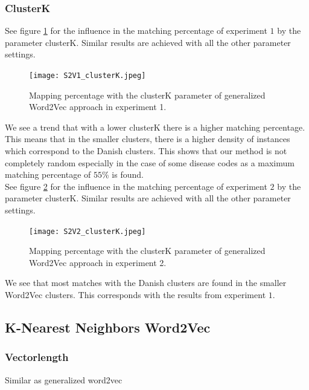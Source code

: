 \subsubsection{ClusterK}

See figure \ref{fig:s2v_clusterK_1} for the influence in the matching percentage of experiment $1$ by the parameter clusterK. Similar results are achieved with all the other parameter settings. \\

\begin{figure}[!htb]
	\centering
	\texttt{[image: S2V1\_clusterK.jpeg]}
	\caption{Mapping percentage with the clusterK parameter of generalized Word2Vec approach in experiment 1.}
	\label{fig:s2v_clusterK_1}
\end{figure}

\noindent We see a trend that with a lower clusterK there is a higher matching percentage. This means that in the smaller clusters, there is a higher density of instances which correspond to the Danish clusters. This shows that our method is not completely random especially in the case of some disease codes as a maximum matching percentage of $55$\% is found. \\

\noindent See figure \ref{fig:s2v_clusterK_2} for the influence in the matching percentage of experiment $2$ by the parameter clusterK. Similar results are achieved with all the other parameter settings. \\

\begin{figure}[!htb]
	\centering
	\texttt{[image: S2V2\_clusterK.jpeg]}
	\caption{Mapping percentage with the clusterK parameter of generalized Word2Vec approach in experiment 2.}
	\label{fig:s2v_clusterK_2}
\end{figure}

\noindent We see that most matches with the Danish clusters are found in the smaller Word2Vec clusters. This corresponds with the results from experiment $1$.

\subsection{K-Nearest Neighbors Word2Vec}

\subsubsection*{Vectorlength}

Similar as generalized word2vec

